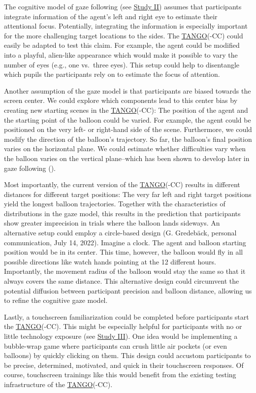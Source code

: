 \documentclass[
]{scrbook}
\begin{document}
The cognitive model of gaze following (see \hyperref[studyII]{Study II}) assumes that participants integrate information of the agent's left and right eye to estimate their attentional focus. Potentially, integrating the information is especially important for the more challenging target locations to the sides. The \hyperref[acronyms_TANGO]{TANGO}(-CC) could easily be adapted to test this claim. For example, the agent could be modified into a playful, alien-like appearance which would make it possible to vary the number of eyes (e.g., one vs.~three eyes). This setup could help to disentangle which pupils the participants rely on to estimate the focus of attention.

Another assumption of the gaze model is that participants are biased towards the screen center. We could explore which components lead to this center bias by creating new starting scenes in the \hyperref[acronyms_TANGO]{TANGO}(-CC): The position of the agent and the starting point of the balloon could be varied. For example, the agent could be positioned on the very left- or right-hand side of the scene. Furthermore, we could modify the direction of the balloon's trajectory. So far, the balloon's final position varies on the horizontal plane. We could estimate whether difficulties vary when the balloon varies on the vertical plane\thinspace --\thinspace which has been shown to develop later in gaze following ().

Most importantly, the current version of the \hyperref[acronyms_TANGO]{TANGO}(-CC) results in different distances for different target positions: The very far left and right target positions yield the longest balloon trajectories. Together with the characteristics of distributions in the gaze model, this results in the prediction that participants show greater imprecision in trials where the balloon lands sideways. An alternative setup could employ a circle-based design (G. Gredebäck, personal communication, July 14, 2022). Imagine a clock. The agent and balloon starting position would be in its center. This time, however, the balloon would fly in all possible directions like watch hands pointing at the 12 different hours. Importantly, the movement radius of the balloon would stay the same so that it always covers the same distance. This alternative design could circumvent the potential diffusion between participant precision and balloon distance, allowing us to refine the cognitive gaze model.

Lastly, a touchscreen familiarization could be completed before participants start the \hyperref[acronyms_TANGO]{TANGO}(-CC). This might be especially helpful for participants with no or little technology exposure (see \hyperref[studyIII]{Study III}). One idea would be implementing a bubble-wrap game where participants can crush little air pockets (or even balloons) by quickly clicking on them. This design could accustom participants to be precise, determined, motivated, and quick in their touchscreen responses. Of course, touchscreen trainings like this would benefit from the existing testing infrastructure of the \hyperref[acronyms_TANGO]{TANGO}(-CC).
\end{document}
